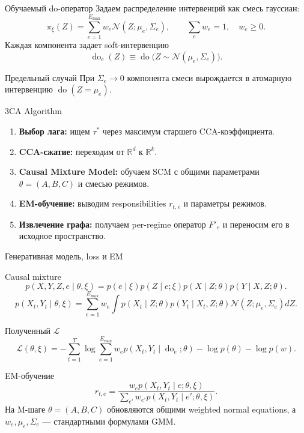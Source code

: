 \documentclass[19pt,pdf,hyperref={unicode}]{beamer}
\newcommand{\R}{\mathbb{R}}
\newcommand{\Normal}{\mathcal{N}}
\newcommand{\Loss}{\mathcal{L}}
\newcommand{\doop}{\operatorname{do}}
\begin{document}
\begin{frame}{Обучаемый do-оператор}
Задаем распределение интервенций как смесь гауссиан:
\[
    \pi_\xi(Z) = \sum_{e=1}^{E_{\max}} w_e \Normal(Z;\mu_e,\Sigma_e),
    \qquad \sum_e w_e = 1, \quad w_e \ge 0.
\]
Каждая компонента задает soft-интервенцию
\[
    \doop_e(Z) \equiv \doop\big(Z \sim \Normal(\mu_e,\Sigma_e)\big).
\]

\begin{block}{Предельный случай}
При $\Sigma_e \to 0$ компонента смеси вырождается в атомарную интервенцию $\doop(Z=\mu_e)$.
\end{block}
\end{frame}

\begin{frame}{3CA Algorithm}
\begin{enumerate}
    \item \textbf{Выбор лага:} ищем $\tau^*$ через максимум старшего CCA-коэффициента.
    \item \textbf{CCA-сжатие:} переходим от $\R^d$ к $\R^k$.
    \item \textbf{Causal Mixture Model:} обучаем SCM с общими параметрами $\theta=(A,B,C)$ и смесью режимов.
    \item \textbf{EM-обучение:} выводим responsibilities $r_{t,e}$ и параметры режимов.
    \item \textbf{Извлечение графа:} получаем per-regime оператор $F'_e$ и переносим его в исходное пространство.
\end{enumerate}
\end{frame}

\begin{frame}{Генеративная модель, loss и EM}
\small
\begin{block}{Causal mixture}
\[
 p(X,Y,Z,e\mid\theta,\xi)=p(e\mid\xi)p(Z\mid e;\xi)p(X\mid Z;\theta)p(Y\mid X,Z;\theta).
\]
\[
 p(X_t,Y_t\mid\theta,\xi)=\sum_{e=1}^{E_{\max}} w_e
 \int p(X_t\mid Z;\theta)p(Y_t\mid X_t,Z;\theta)\Normal(Z;\mu_e,\Sigma_e)dZ.
\]
\end{block}

\begin{block}{Полученный $\mathcal{L}$}
\[
\Loss(\theta,\xi)=
-\sum_{t=1}^{T}\log\sum_{e=1}^{E_{\max}}w_e p(X_t,Y_t\mid\doop_e;\theta)
-\log p(\theta)-\log p(w).
\]
\end{block}

\begin{block}{EM-обучение}
\[
 r_{t,e}=\frac{w_e p(X_t,Y_t\mid e;\theta,\xi)}
 {\sum_{e'}w_{e'}p(X_t,Y_t\mid e';\theta,\xi)}.
\]
На M-шаге $\theta=(A,B,C)$ обновляются общими weighted normal equations, а $w_e,\mu_e,\Sigma_e$ --- стандартными формулами GMM.
\end{block}
\end{frame}
\end{document}
